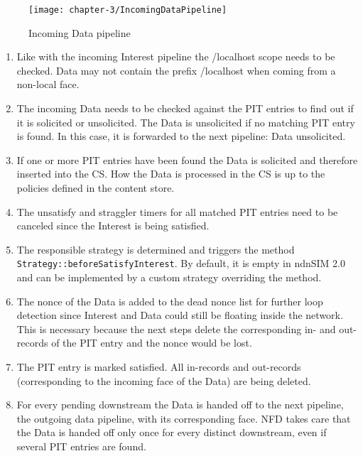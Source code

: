 \vspace{5mm} %

\begin{figure}[H]
  \centering
  \texttt{[image: chapter-3/IncomingDataPipeline]}
  \caption{Incoming Data pipeline \cite{Afanasyev16}}
  \label{fig:IncomingDataPipeline}
\end{figure}

\vspace{5mm} %

\begin{enumerate}
\item Like with the incoming Interest pipeline the /localhost scope needs to be checked. Data may not contain the prefix /localhost when coming from a non-local face.
\item The incoming Data needs to be checked against the PIT entries to find out if it is solicited or unsolicited. The Data is unsolicited if no matching PIT entry is found. In this case, it is forwarded to the next pipeline: Data unsolicited.
\item If one or more PIT entries have been found the Data is solicited and therefore inserted into the CS. How the Data is processed in the CS is up to the policies defined in the content store.
\item The unsatisfy and straggler timers for all matched PIT entries need to be canceled since the Interest is being satisfied.
\item The responsible strategy is determined and triggers the method \texttt{Strategy::beforeSatisfyInterest}. By default, it is empty in ndnSIM 2.0 and can be implemented by a custom strategy overriding the method.
\item The nonce of the Data is added to the dead nonce list for further loop detection since Interest and Data could still be floating inside the network. This is necessary because the next steps delete the corresponding in- and out-records of the PIT entry and the nonce would be lost. 
\item The PIT entry is marked satisfied. All in-records and out-records (corresponding to the incoming face of the Data) are being deleted.
\item For every pending downstream the Data is handed off to the next pipeline, the outgoing data pipeline, with its corresponding face. NFD takes care that the Data is handed off only once for every distinct downstream, even if several PIT entries are found.
\end{enumerate}

